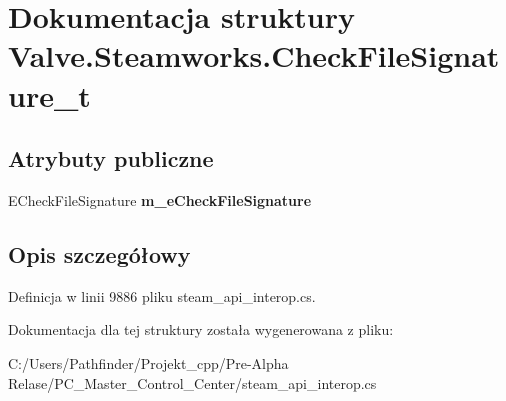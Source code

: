 \hypertarget{struct_valve_1_1_steamworks_1_1_check_file_signature__t}{}\section{Dokumentacja struktury Valve.\+Steamworks.\+Check\+File\+Signature\+\_\+t}
\label{struct_valve_1_1_steamworks_1_1_check_file_signature__t}
\subsection*{Atrybuty publiczne}
\begin{DoxyCompactItemize}
\item 
\mbox{\label{struct_valve_1_1_steamworks_1_1_check_file_signature__t_a5e2a5e6d9d5539e16b39bebc5a156fd3}} 
E\+Check\+File\+Signature {\bfseries m\+\_\+e\+Check\+File\+Signature}
\end{DoxyCompactItemize}


\subsection{Opis szczegółowy}


Definicja w linii 9886 pliku steam\+\_\+api\+\_\+interop.\+cs.



Dokumentacja dla tej struktury została wygenerowana z pliku\+:\begin{DoxyCompactItemize}
\item 
C\+:/\+Users/\+Pathfinder/\+Projekt\+\_\+cpp/\+Pre-\/\+Alpha Relase/\+P\+C\+\_\+\+Master\+\_\+\+Control\+\_\+\+Center/steam\+\_\+api\+\_\+interop.\+cs\end{DoxyCompactItemize}
